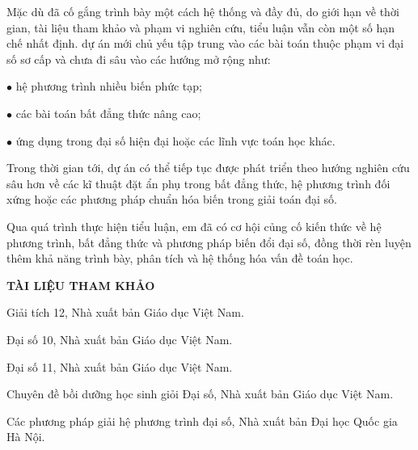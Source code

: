 \documentclass[12pt]{report}
\begin{document}
\vspace{0.3cm}
\noindent Mặc dù đã cố gắng trình bày một cách hệ thống và đầy đủ, do giới hạn về thời gian, tài liệu tham khảo và phạm vi nghiên cứu, tiểu luận vẫn còn một số hạn chế nhất định. dự án mới chủ yếu tập trung vào các bài toán thuộc phạm vi đại số sơ cấp và chưa đi sâu vào các hướng mở rộng như:

\vspace{0.2cm}
\noindent $\bullet$ hệ phương trình nhiều biến phức tạp;

\vspace{0.1cm}
\noindent $\bullet$ các bài toán bất đẳng thức nâng cao;

\vspace{0.1cm}
\noindent $\bullet$ ứng dụng trong đại số hiện đại hoặc các lĩnh vực toán học khác.

\vspace{0.3cm}
\noindent Trong thời gian tới, dự án có thể tiếp tục được phát triển theo hướng nghiên cứu sâu hơn về các kĩ thuật đặt ẩn phụ trong bất đẳng thức, hệ phương trình đối xứng hoặc các phương pháp chuẩn hóa biến trong giải toán đại số.

\vspace{0.3cm}
\noindent Qua quá trình thực hiện tiểu luận, em đã có cơ hội củng cố kiến thức về hệ phương trình, bất đẳng thức và phương pháp biến đổi đại số, đồng thời rèn luyện thêm khả năng trình bày, phân tích và hệ thống hóa vấn đề toán học.
\newpage 
\begin{center}
    \textbf{\Large TÀI LIỆU THAM KHẢO}
\end{center}

\vspace{0.5cm}

\noindent [1] Giải tích 12, Nhà xuất bản Giáo dục Việt Nam.

\vspace{0.2cm}
\noindent [2] Đại số 10, Nhà xuất bản Giáo dục Việt Nam.

\vspace{0.2cm}
\noindent [3] Đại số 11, Nhà xuất bản Giáo dục Việt Nam.

\vspace{0.2cm}
\noindent [4] Chuyên đề bồi dưỡng học sinh giỏi Đại số, Nhà xuất bản Giáo dục Việt Nam.

\vspace{0.2cm}
\noindent [5] Các phương pháp giải hệ phương trình đại số, Nhà xuất bản Đại học Quốc gia Hà Nội.
\end{document}

